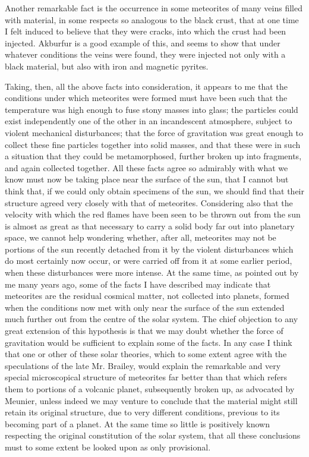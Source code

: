 \documentclass[a4paper, 12pt, oneside]{article}
\begin{document}
Another remarkable fact is the occurrence in some meteorites of many veins filled with material, in some respects so analogous to the black crust, that at one time I felt induced to believe that they were cracks, into which the crust had been injected. Akburfur is a good example of this, and seems to show that under whatever conditions the veins were found, they were injected not only with a black material, but also with iron and magnetic pyrites.

Taking, then, all the above facts into consideration, it appears to me that the conditions under which meteorites were formed must have been such that the temperature was high enough to fuse stony masses into glass; the particles could exist independently one of the other in an incandescent atmosphere, subject to violent mechanical disturbances; that the force of gravitation was great enough to collect these fine particles together into solid masses, and that these were in such a situation that they could be metamorphosed, further broken up into fragments, and again collected together. All these facts agree so admirably with what we know must now be taking place near the surface of the sun, that I cannot but think that, if we could only obtain specimens of the sun, we should find that their structure agreed very closely with that of meteorites. Considering also that the velocity with which the red flames have been seen to be thrown out from the sun is almost as great as that necessary to carry a solid body far out into planetary space, we cannot help wondering whether, after all, meteorites may not be portions of the sun recently detached from it by the violent disturbances which do most certainly now occur, or were carried off from it at some earlier period, when these disturbances were more intense. At the same time, as pointed out by me many years ago, some of the facts I have described may indicate that meteorites are the residual cosmical matter, not collected into planets, formed when the conditions now met with only near the surface of the sun extended much further out from the centre of the solar system. The chief objection to any great extension of this hypothesis is that we may doubt whether the force of gravitation would be sufficient to explain some of the facts. In any case I think that one or other of these solar theories, which to some extent agree with the speculations of the late Mr. Brailey, would explain the remarkable and very special microscopical structure of meteorites far better than that which refers them to portions of a volcanic planet, subsequently broken up, as advocated by Meunier, unless indeed we may venture to conclude that the material might still retain its original structure, due to very different conditions, previous to its becoming part of a planet. At the same time so little is positively known respecting the original constitution of the solar system, that all these conclusions must to some extent be looked upon as only provisional.
\end{document}
